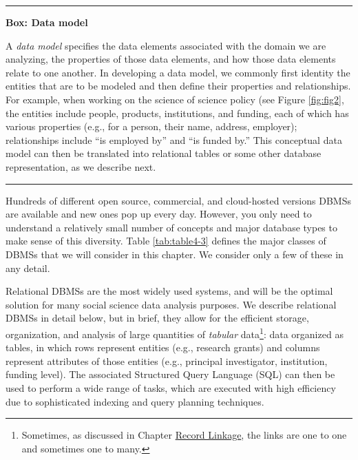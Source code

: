 \documentclass[]{krantz}
\begin{document}
\begin{center}\rule{0.5\linewidth}{\linethickness}\end{center}

\textbf{Box: Data model}

A \emph{data model} specifies the data elements associated with the
domain we are analyzing, the properties of those data elements, and how
those data elements relate to one another. In developing a data model,
we commonly first identity the entities that are to be modeled and then
define their properties and relationships. For example, when working on
the science of science policy (see Figure \ref{fig:fig2}, the entities
include people, products, institutions, and funding, each of which has
various properties (e.g., for a person, their name, address, employer);
relationships include ``is employed by'' and ``is funded by.'' This
conceptual data model can then be translated into relational tables or
some other database representation, as we describe next.

\begin{center}\rule{0.5\linewidth}{\linethickness}\end{center}

Hundreds of different open source, commercial, and cloud-hosted versions
DBMSs are available and new ones pop up every day. However, you only
need to understand a relatively small number of concepts and major
database types to make sense of this diversity. Table \ref{tab:table4-3}
defines the major classes of DBMSs that we will consider in this
chapter. We consider only a few of these in any detail.

Relational DBMSs are the most widely used systems, and will be the
optimal solution for many social science data analysis purposes. We
describe relational DBMSs in detail below, but in brief, they allow for
the efficient storage, organization, and analysis of large quantities of
\emph{tabular} data\footnote{Sometimes, as discussed in Chapter
  \protect\hyperlink{chap:link}{Record Linkage}, the links are one to
  one and sometimes one to many.}: data organized as tables, in which
rows represent entities (e.g., research grants) and columns represent
attributes of those entities (e.g., principal investigator, institution,
funding level). The associated Structured Query Language (SQL) can then
be used to perform a wide range of tasks, which are executed with high
efficiency due to sophisticated indexing and query planning techniques.
\end{document}
